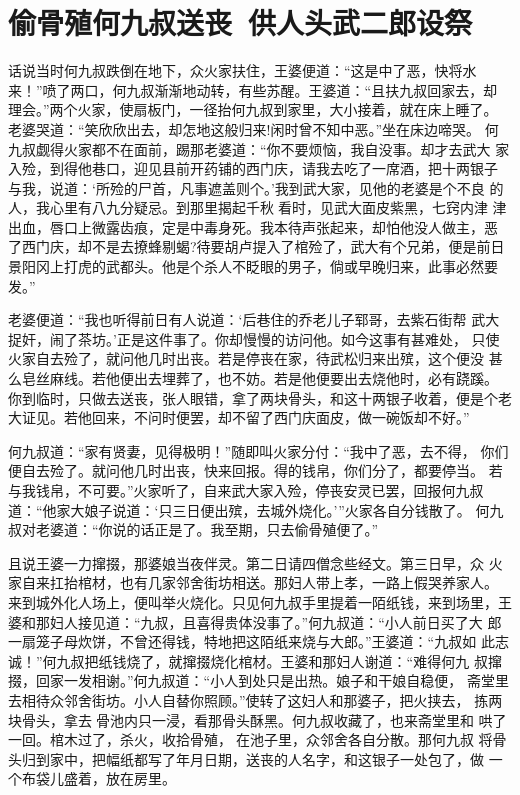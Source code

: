 \chapter{偷骨殖何九叔送丧~供人头武二郎设祭}

话说当时何九叔跌倒在地下，众火家扶住，王婆便道：“这是中了恶，快将水
来！”喷了两口，何九叔渐渐地动转，有些苏醒。王婆道：“且扶九叔回家去，却
理会。”两个火家，使扇板门，一径抬何九叔到家里，大小接着，就在床上睡了。
老婆哭道：“笑欣欣出去，却怎地这般归来!闲时曾不知中恶。”坐在床边啼哭。
何九叔觑得火家都不在面前，踢那老婆道：“你不要烦恼，我自没事。却才去武大
家入殓，到得他巷口，迎见县前开药铺的西门庆，请我去吃了一席酒，把十两银子
与我，说道：‘所殓的尸首，凡事遮盖则个。’我到武大家，见他的老婆是个不良
的人，我心里有八九分疑忌。到那里揭起千秋看时，见武大面皮紫黑，七窍内津
津出血，唇口上微露齿痕，定是中毒身死。我本待声张起来，却怕他没人做主，恶
了西门庆，却不是去撩蜂剔蝎?待要胡卢提入了棺殓了，武大有个兄弟，便是前日
景阳冈上打虎的武都头。他是个杀人不眨眼的男子，倘或早晚归来，此事必然要发。”

老婆便道：“我也听得前日有人说道：‘后巷住的乔老儿子郓哥，去紫石街帮
武大捉奸，闹了茶坊。’正是这件事了。你却慢慢的访问他。如今这事有甚难处，
只使火家自去殓了，就问他几时出丧。若是停丧在家，待武松归来出殡，这个便没
甚么皂丝麻线。若他便出去埋葬了，也不妨。若是他便要出去烧他时，必有跷蹊。
你到临时，只做去送丧，张人眼错，拿了两块骨头，和这十两银子收着，便是个老
大证见。若他回来，不问时便罢，却不留了西门庆面皮，做一碗饭却不好。”

何九叔道：“家有贤妻，见得极明！”随即叫火家分付：“我中了恶，去不得，
你们便自去殓了。就问他几时出丧，快来回报。得的钱帛，你们分了，都要停当。
若与我钱帛，不可要。”火家听了，自来武大家入殓，停丧安灵已罢，回报何九叔
道：“他家大娘子说道：‘只三日便出殡，去城外烧化。’”火家各自分钱散了。
何九叔对老婆道：“你说的话正是了。我至期，只去偷骨殖便了。”

且说王婆一力撺掇，那婆娘当夜伴灵。第二日请四僧念些经文。第三日早，众
火家自来扛抬棺材，也有几家邻舍街坊相送。那妇人带上孝，一路上假哭养家人。
来到城外化人场上，便叫举火烧化。只见何九叔手里提着一陌纸钱，来到场里，王
婆和那妇人接见道：“九叔，且喜得贵体没事了。”何九叔道：“小人前日买了大
郎一扇笼子母炊饼，不曾还得钱，特地把这陌纸来烧与大郎。”王婆道：“九叔如
此志诚！”何九叔把纸钱烧了，就撺掇烧化棺材。王婆和那妇人谢道：“难得何九
叔撺掇，回家一发相谢。”何九叔道：“小人到处只是出热。娘子和干娘自稳便，
斋堂里去相待众邻舍街坊。小人自替你照顾。”使转了这妇人和那婆子，把火挟去，
拣两块骨头，拿去骨池内只一浸，看那骨头酥黑。何九叔收藏了，也来斋堂里和
哄了一回。棺木过了，杀火，收拾骨殖，在池子里，众邻舍各自分散。那何九叔
将骨头归到家中，把幅纸都写了年月日期，送丧的人名字，和这银子一处包了，做
一个布袋儿盛着，放在房里。

